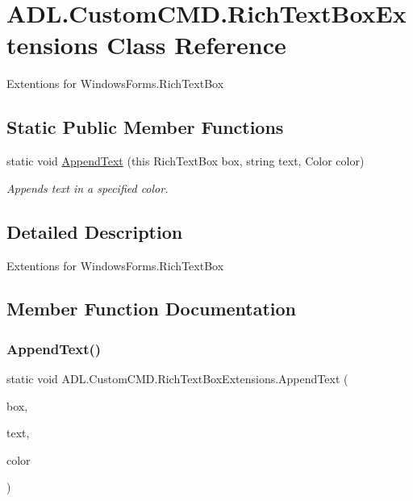 \hypertarget{class_a_d_l_1_1_custom_c_m_d_1_1_rich_text_box_extensions}{}\section{A\+D\+L.\+Custom\+C\+M\+D.\+Rich\+Text\+Box\+Extensions Class Reference}
\label{class_a_d_l_1_1_custom_c_m_d_1_1_rich_text_box_extensions}


Extentions for Windows\+Forms.\+Rich\+Text\+Box  


\subsection*{Static Public Member Functions}
\begin{DoxyCompactItemize}
\item 
static void \mbox{\hyperlink{class_a_d_l_1_1_custom_c_m_d_1_1_rich_text_box_extensions_a47d508f47f347c3631bcfeb940b080e3}{Append\+Text}} (this Rich\+Text\+Box box, string text, Color color)
\begin{DoxyCompactList}\small\item\em Appends text in a specified color. \end{DoxyCompactList}\end{DoxyCompactItemize}


\subsection{Detailed Description}
Extentions for Windows\+Forms.\+Rich\+Text\+Box 



\subsection{Member Function Documentation}
\mbox{\label{class_a_d_l_1_1_custom_c_m_d_1_1_rich_text_box_extensions_a47d508f47f347c3631bcfeb940b080e3}} 
\subsubsection{\texorpdfstring{Append\+Text()}{AppendText()}}
{\footnotesize\ttfamily static void A\+D\+L.\+Custom\+C\+M\+D.\+Rich\+Text\+Box\+Extensions.\+Append\+Text (\begin{DoxyParamCaption}\item[{this Rich\+Text\+Box}]{box,  }\item[{string}]{text,  }\item[{Color}]{color }\end{DoxyParamCaption})\hspace{0.3cm}{\ttfamily [static]}}



